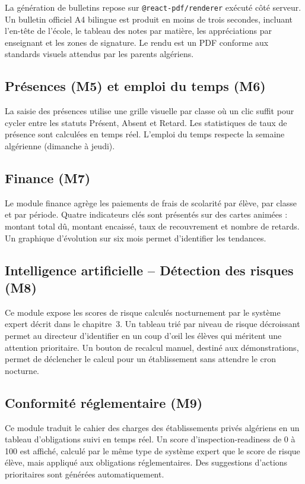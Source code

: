 \documentclass[12pt,a4paper,oneside]{report}
\begin{document}
La génération de bulletins repose sur \texttt{@react-pdf/renderer} exécuté côté serveur. Un bulletin officiel A4 bilingue est produit en moins de trois secondes, incluant l'en-tête de l'école, le tableau des notes par matière, les appréciations par enseignant et les zones de signature. Le rendu est un PDF conforme aux standards visuels attendus par les parents algériens.

\subsection{Présences (M5) et emploi du temps (M6)}

La saisie des présences utilise une grille visuelle par classe où un clic suffit pour cycler entre les statuts Présent, Absent et Retard. Les statistiques de taux de présence sont calculées en temps réel. L'emploi du temps respecte la semaine algérienne (dimanche à jeudi).

\subsection{Finance (M7)}

Le module finance agrège les paiements de frais de scolarité par élève, par classe et par période. Quatre indicateurs clés sont présentés sur des cartes animées : montant total dû, montant encaissé, taux de recouvrement et nombre de retards. Un graphique d'évolution sur six mois permet d'identifier les tendances.

\subsection{Intelligence artificielle -- Détection des risques (M8)}

Ce module expose les scores de risque calculés nocturnement par le système expert décrit dans le chapitre~3. Un tableau trié par niveau de risque décroissant permet au directeur d'identifier en un coup d'œil les élèves qui méritent une attention prioritaire. Un bouton de recalcul manuel, destiné aux démonstrations, permet de déclencher le calcul pour un établissement sans attendre le cron nocturne.

\subsection{Conformité réglementaire (M9)}

Ce module traduit le cahier des charges des établissements privés algériens en un tableau d'obligations suivi en temps réel. Un score d'inspection-readiness de 0 à 100 est affiché, calculé par le même type de système expert que le score de risque élève, mais appliqué aux obligations réglementaires. Des suggestions d'actions prioritaires sont générées automatiquement.
\end{document}

